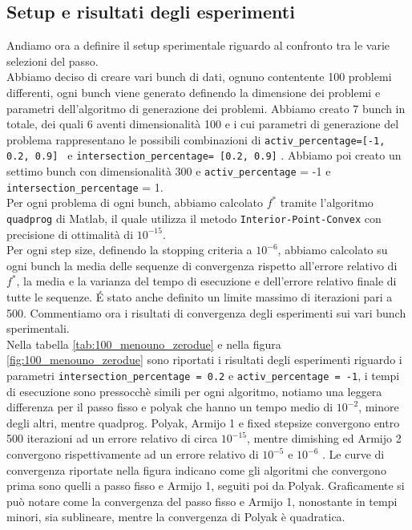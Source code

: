 \documentclass[12pt]{extarticle}
\begin{document}
\subsection{Setup e risultati degli esperimenti}
Andiamo ora a definire il setup sperimentale riguardo al confronto tra le varie selezioni del passo.\\
Abbiamo deciso di creare vari bunch di dati, ognuno contentente 100 problemi differenti, ogni bunch viene generato definendo la dimensione dei problemi e parametri dell'algoritmo di generazione dei problemi. Abbiamo creato 7 bunch in totale, dei quali 6 aventi dimensionalità 100 e i cui parametri di generazione del problema rappresentano le possibili combinazioni di \texttt{activ\_percentage=[-1, 0.2, 0.9] } e \texttt{intersection\_percentage= [0.2, 0.9]} . Abbiamo poi creato un settimo bunch con dimensionalità 300 e \texttt{activ\_percentage} = -1 e  \texttt{intersection\_percentage} = 1.\\
Per ogni problema di ogni bunch, abbiamo calcolato $f^*$ tramite l'algoritmo \texttt{quadprog} di Matlab, il quale utilizza il metodo \texttt{Interior-Point-Convex} con precisione di ottimalità di $10^{-15}$.\\
Per ogni step size, definendo la stopping criteria a $10^{-6}$, abbiamo calcolato su ogni bunch la media delle sequenze di convergenza rispetto all'errore relativo di $f^*$, la media e la varianza del tempo di esecuzione e dell'errore relativo finale di tutte le sequenze. \'E stato anche definito un limite massimo di iterazioni pari a 500. Commentiamo ora i risultati di convergenza degli esperimenti sui vari bunch sperimentali. \\
Nella tabella \ref{tab:100_menouno_zerodue} e nella figura \ref{fig:100_menouno_zerodue} sono riportati i risultati degli esperimenti riguardo i parametri \texttt{intersection\_percentage = 0.2} e \texttt{activ\_percentage = -1}, i tempi di esecuzione sono pressocchè simili per ogni algoritmo, notiamo una leggera differenza per il passo fisso e polyak che hanno un tempo medio di $10^{-2}$, minore degli altri, mentre quadprog.  Polyak, Armijo 1 e fixed stepsize convergono entro 500 iterazioni ad un errore relativo di circa $10^{-15}$, mentre dimishing ed Armijo 2 convergono rispettivamente ad un errore relativo di $10^{-5}$ e $10^{-6}$ . Le curve di convergenza riportate nella figura indicano come gli algoritmi che convergono prima sono quelli a passo fisso e Armijo 1, seguiti poi da Polyak. Graficamente si può notare come la convergenza del passo fisso e Armijo 1, nonostante in tempi minori, sia sublineare, mentre la convergenza di Polyak è quadratica.\\
\end{document}
